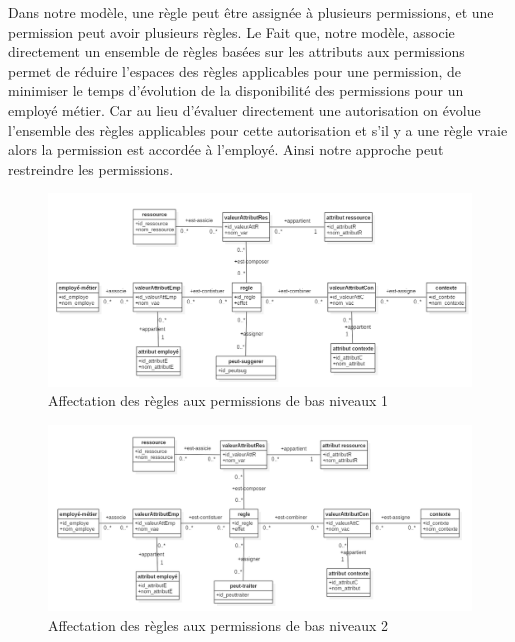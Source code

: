
\label{sectionAttributionReglePermission}

Dans notre modèle, une règle peut être assignée à plusieurs permissions, et une permission peut avoir plusieurs règles. Le Fait que, notre modèle, associe directement un ensemble de règles basées sur les attributs aux permissions permet de réduire l'espaces des règles applicables pour une permission, de minimiser le temps d'évolution de la disponibilité des permissions pour un  employé métier. Car au lieu  d'évaluer directement une autorisation on évolue l'ensemble des règles applicables pour cette autorisation et s'il y a une règle vraie alors la permission est accordée à l'employé.  Ainsi notre approche peut restreindre les permissions. 

\begin{figure}[h!]
    \centering
		\includegraphics[scale=0.6]{chap3/images/regle-peutsuggerer.png}
    \caption{Affectation des règles aux permissions de bas niveaux 1}
	 \label{figregle-peutsuggerer}
\end{figure} 

\begin{figure}[h!]
    \centering
		\includegraphics[scale=0.6]{chap3/images/reglePeutTraiter.png}
    \caption{Affectation des règles aux permissions de bas niveaux 2}
	 \label{figreglePeutTraiter}
\end{figure} 
\label{sectionParapheur}

